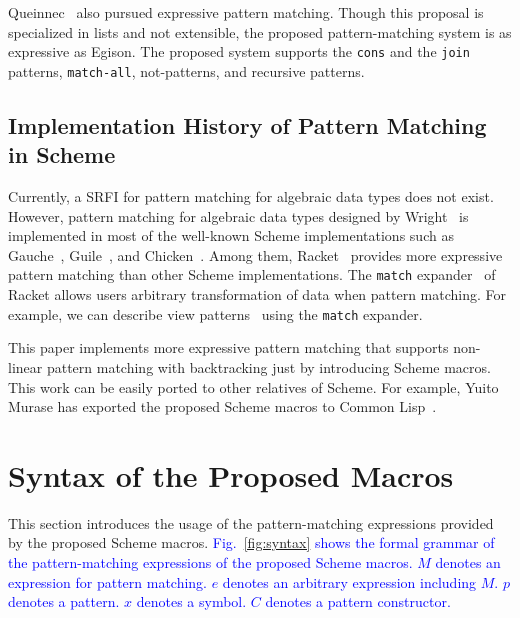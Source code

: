 \documentclass[acmlarge]{acmart}
\newcommand{\todo}[1]{\textcolor{red}{(TODO: #1)}}
\newcommand{\new}[1]{\textcolor{blue}{#1}}
\begin{document}
Queinnec~\cite{queinnec1990compilation} also pursued expressive pattern matching.
Though this proposal is specialized in lists and not extensible, the proposed pattern-matching system is as expressive as Egison.
The proposed system supports the \lstinline{cons} and the \lstinline{join} patterns, \lstinline{match-all}, not-patterns, and recursive patterns.


\subsection{Implementation History of Pattern Matching in Scheme}\label{history2}


Currently, a SRFI for pattern matching for algebraic data types does not exist.
However, pattern matching for algebraic data types designed by Wright~\cite{wright1993pattern} is implemented in most of the well-known Scheme implementations such as Gauche~\cite{gauchePM}, Guile~\cite{guilePM}, and Chicken~\cite{chickenPM}.
Among them, Racket~\cite{plt-tr1} provides more expressive pattern matching than other Scheme implementations.
The \lstinline{match} expander~\cite{tobin2011extensible} of Racket allows users arbitrary transformation of data when pattern matching.
For example, we can describe view patterns~\cite{wadler1987views} using the \lstinline{match} expander.

This paper implements more expressive pattern matching that supports non-linear pattern matching with backtracking just by introducing Scheme macros.
This work can be easily ported to other relatives of Scheme.
For example, Yuito Murase has exported the proposed Scheme macros to Common Lisp~\cite{egisonLisp}.


\section{Syntax of the Proposed Macros}\label{usage}

This section introduces the usage of the pattern-matching expressions provided by the proposed Scheme macros.
\new{
Fig.~\ref{fig:syntax} shows the formal grammar of the pattern-matching expressions of the proposed Scheme macros.
$M$ denotes an expression for pattern matching.
$e$ denotes an arbitrary expression including $M$.
$p$ denotes a pattern.
$x$ denotes a symbol.
$C$ denotes a pattern constructor.
}%
\end{document}
